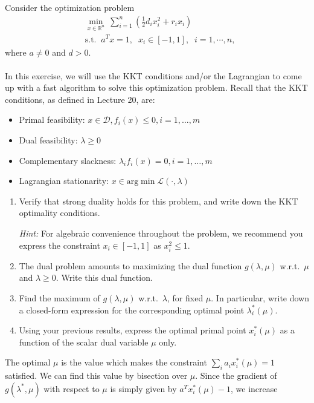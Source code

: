 \documentclass[11pt]{article}
\begin{document}
Consider the optimization problem
\begin{align*}
&\min_{x \in \mathbb{R}^{n}} \: \sum_{i=1}^n \left(\frac{1}{2}d_i x_i^2 + r_ix_i\right)\\
&\text{s.t.} \;\; a^T x=1, \;\; x_i \in [-1,1], \;\; i=1,\cdots,n,
\end{align*}
where $a \neq 0$ and $d> 0$. \\ \\ 
In this exercise, we will use the KKT conditions and/or the Lagrangian to come up with a fast algorithm to solve this optimization problem. Recall that the KKT conditions, as defined in Lecture 20, are:
\begin{itemize}
    \item Primal feasibility: $x \in \mathcal{D}, f_i(x) \leq 0, i = 1, \dots, m$
    \item Dual feasibility: $\lambda \geq 0$
    \item Complementary slackness: $\lambda_i f_i(x) = 0, i = 1, \dots, m$
    \item Lagrangian stationarity: $x \in \text{arg} \min \mathcal{L}(\cdot, \lambda)$
\end{itemize}
\begin{enumerate}
\item Verify that strong duality holds for this problem, and write down the KKT optimality conditions.

\emph{Hint: } For algebraic convenience throughout the problem, we recommend you express the constraint $x_i \in [-1, 1]$ as $x_i^2 \leq 1$.

\item The dual problem amounts to maximizing the dual function $g(\lambda,\mu)$ w.r.t.\ $\mu$ and $\lambda\geq 0$. Write this dual function.

\item  Find the maximum of $g(\lambda,\mu)$ w.r.t.\ $\lambda$, for fixed $\mu$. In particular, write down a closed-form expression for the corresponding optimal point $\lambda_i^*(\mu)$.

\item Using your previous results, express the optimal primal point $x_i^*(\mu)$ as a function of the scalar dual variable $\mu$ only.
\end{enumerate}
The optimal $\mu$ is the value which makes the constraint $\sum_{i} a_ix_i^*(\mu) = 1 $ satisfied.
We can find this value by bisection over $\mu$. Since the gradient of $g(\lambda^*,\mu)$ with respect to $\mu$
is simply given by $a^T x_i^*(\mu)-1$, we increase
\end{document}
